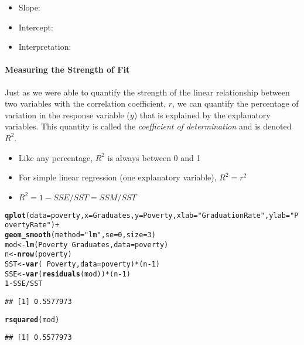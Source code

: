 \documentclass[10pt]{article}\usepackage[]{graphicx}\usepackage[]{color}
\makeatletter
\newcommand{\hlnum}[1]{\textcolor[rgb]{0.686,0.059,0.569}{#1}}%
\newcommand{\hlstr}[1]{\textcolor[rgb]{0.192,0.494,0.8}{#1}}%
\newcommand{\hlopt}[1]{\textcolor[rgb]{0,0,0}{#1}}%
\newcommand{\hlstd}[1]{\textcolor[rgb]{0.345,0.345,0.345}{#1}}%
\newcommand{\hlkwb}[1]{\textcolor[rgb]{0.69,0.353,0.396}{#1}}%
\newcommand{\hlkwc}[1]{\textcolor[rgb]{0.333,0.667,0.333}{#1}}%
\newcommand{\hlkwd}[1]{\textcolor[rgb]{0.737,0.353,0.396}{\textbf{#1}}}%
\newenvironment{kframe}{%
 \def\at@end@of@kframe{}%
 \ifinner\ifhmode%
  \def\at@end@of@kframe{\end{minipage}}%
  \begin{minipage}{\columnwidth}%
 \fi\fi%
 \def\FrameCommand##1{\hskip\@totalleftmargin \hskip-\fboxsep
 \colorbox{shadecolor}{##1}\hskip-\fboxsep
     \hskip-\linewidth \hskip-\@totalleftmargin \hskip\columnwidth}%
 \MakeFramed {\advance\hsize-\width
   \@totalleftmargin\z@ \linewidth\hsize
   \@setminipage}}%
 {\par\unskip\endMakeFramed%
 \at@end@of@kframe}
\newenvironment{knitrout}{}{} %
\makeatother
\begin{document}
\begin{itemize}
  \itemsep0.5in
  \item Slope:
  \item Intercept:
  \item Interpretation:
  \vspace{0.5in}
\end{itemize}


\paragraph{Measuring the Strength of Fit}

Just as we were able to quantify the strength of the linear relationship between two variables with the correlation coefficient, $r$, we can quantify the percentage of variation in the response variable ($y$) that is explained by the explanatory variables. This quantity is called the \emph{coefficient of determination} and is denoted $R^2$.

\begin{itemize}
  \itemsep0in
  \item Like any percentage, $R^2$ is always between 0 and 1
  \item For simple linear regression (one explanatory variable), $R^2 = r^2$
  \item $R^2 = 1 - SSE/SST = SSM/SST$
\end{itemize}

\begin{knitrout}\footnotesize
{}\color{fgcolor}\begin{kframe}
\begin{alltt}
\hlkwd{qplot}\hlstd{(}\hlkwc{data} \hlstd{= poverty,} \hlkwc{x} \hlstd{= Graduates,} \hlkwc{y} \hlstd{= Poverty,} \hlkwc{xlab} \hlstd{=} \hlstr{"Graduation Rate"}\hlstd{,} \hlkwc{ylab} \hlstd{=} \hlstr{"Poverty Rate"}\hlstd{)} \hlopt{+}
  \hlkwd{geom_smooth}\hlstd{(}\hlkwc{method} \hlstd{=} \hlstr{"lm"}\hlstd{,} \hlkwc{se} \hlstd{=} \hlnum{0}\hlstd{,} \hlkwc{size} \hlstd{=} \hlnum{3}\hlstd{)}
\hlstd{mod} \hlkwb{<-} \hlkwd{lm}\hlstd{(Poverty} \hlopt{~} \hlstd{Graduates,} \hlkwc{data} \hlstd{= poverty)}
\hlstd{n} \hlkwb{<-} \hlkwd{nrow}\hlstd{(poverty)}
\hlstd{SST} \hlkwb{<-} \hlkwd{var}\hlstd{(}\hlopt{~}\hlstd{Poverty,} \hlkwc{data} \hlstd{= poverty)} \hlopt{*} \hlstd{(n} \hlopt{-} \hlnum{1}\hlstd{)}
\hlstd{SSE} \hlkwb{<-} \hlkwd{var}\hlstd{(}\hlkwd{residuals}\hlstd{(mod))} \hlopt{*} \hlstd{(n} \hlopt{-} \hlnum{1}\hlstd{)}
\hlnum{1} \hlopt{-} \hlstd{SSE} \hlopt{/} \hlstd{SST}
\end{alltt}
\begin{verbatim}
## [1] 0.5577973
\end{verbatim}
\begin{alltt}
\hlkwd{rsquared}\hlstd{(mod)}
\end{alltt}
\begin{verbatim}
## [1] 0.5577973
\end{verbatim}
\end{kframe}
\end{knitrout}
\clearpage
\end{document}
